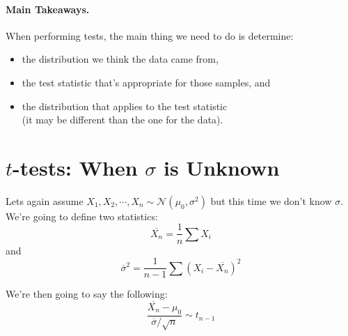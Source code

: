 \paragraph{Main Takeaways.}
When performing tests, the main thing we need to do is determine: 
\begin{itemize}
\item the distribution we think the data came from, 
\item the test statistic that's appropriate for those samples, and 
\item the distribution that applies to the test statistic\\ (it may be different than the one for the data). 
\end{itemize}

\section{$t$-tests: When $\sigma$ is Unknown}
Lets again assume $X_1,X_2,\cdots,X_n\sim\mathcal{N}(\mu_0,\sigma^2)$ but this time we don't know $\sigma$. 
We're going to define two statistics: 
\[\overline{X_n} = \frac{1}{n}\sum X_i\]
and
\[\overline{\sigma}^2 = \frac{1}{n-1}\sum(X_i-\overline{X_n})^2\]

We're then going to say the following:
\[\frac{\overline{X_n}-\mu_0}{\overline{\sigma}/\sqrt{n}}\sim t_{n-1}\]

